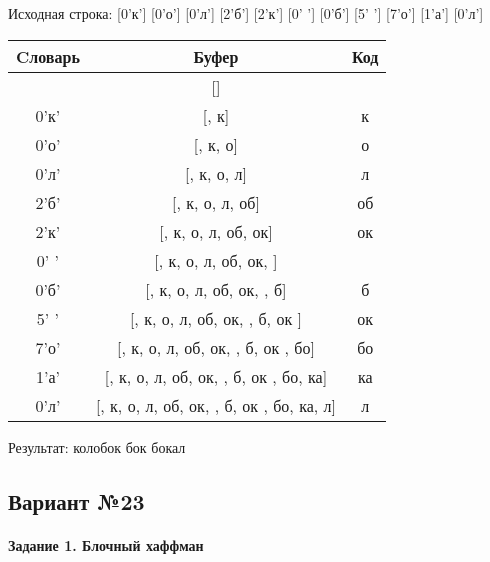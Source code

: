\documentclass[a4paper, 12pt]{article}
\begin{document}
Исходная строка: [0'к'] [0'о'] [0'л'] [2'б'] [2'к'] [0' '] [0'б'] [5' '] [7'о'] [1'а'] [0'л']\\
\begin{table}[h!]
\centering
\begin{tabular}{|c|c|c|}
\hline
 Cловарь & Буфер & Код  \\ \hline
 & [] & 
\\ \hline
0'к' & [, к] & к
\\ \hline
0'о' & [, к, о] & о
\\ \hline
0'л' & [, к, о, л] & л
\\ \hline
2'б' & [, к, о, л, об] & об
\\ \hline
2'к' & [, к, о, л, об, ок] & ок
\\ \hline
0' ' & [, к, о, л, об, ок,  ] &  
\\ \hline
0'б' & [, к, о, л, об, ок,  , б] & б
\\ \hline
5' ' & [, к, о, л, об, ок,  , б, ок ] & ок 
\\ \hline
7'о' & [, к, о, л, об, ок,  , б, ок , бо] & бо
\\ \hline
1'а' & [, к, о, л, об, ок,  , б, ок , бо, ка] & ка
\\ \hline
0'л' & [, к, о, л, об, ок,  , б, ок , бо, ка, л] & л
\\ \hline
\end{tabular}
\end{table}

Результат: колобок бок бокал
\pagebreak
\subsection{Вариант №23}
\paragraph{Задание 1. Блочный хаффман \\}
\end{document}

